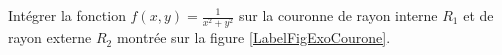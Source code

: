 
\begin{exercice}\label{exoOutilsMath-0092}

    Intégrer la fonction $f(x,y)=\frac{1}{ x^2+y^2 }$ sur la couronne de rayon interne $R_1$ et de rayon externe $R_2$ montrée sur la figure \ref{LabelFigExoCourone}.
    \newcommand{\CaptionFigExoCourone}{Une couronne est une surface typique sur laquelle on a envie de travailler en coordonnées polaires.}
    

\end{exercice}
